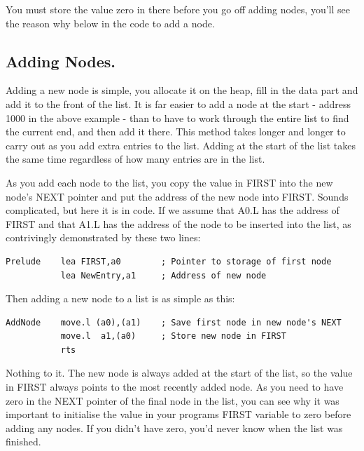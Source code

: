 You must store the value zero in there before you go off adding
    nodes, you'll see the reason why below in the code to add a node.

\subsection{Adding Nodes.}
\label{ch10-adding-nodes}%

Adding a new node is simple, you allocate it on the heap, fill in
      the data part and add it to the front of the list. It is far easier to
      add a node at the start -{} address 1000 in the above example -{} than to
      have to work through the entire list to find the current end, and then
      add it there. This method takes longer and longer to carry out as you
      add extra entries to the list. Adding at the start of the list takes the
      same time regardless of how many entries are in the list.

As you add each node to the list, you copy the value in FIRST into
      the new node's NEXT pointer and put the address of the new node into
      FIRST. Sounds complicated, but here it is in code. If we assume that
      A0.L has the address of FIRST and that A1.L has the address of the node
      to be inserted into the list, as contrivingly demonstrated by these two
      lines:

\begin{lstlisting}[firstnumber=1,caption={Adding a Node - Prelude},label={lst:AddingANodePrelude}]
Prelude    lea FIRST,a0        ; Pointer to storage of first node 
           lea NewEntry,a1     ; Address of new node
\end{lstlisting}

Then adding a new node to a list is as simple as this:

\begin{lstlisting}[firstnumber=last,caption={Adding a Node},label={lst:AddingANode}]
AddNode    move.l (a0),(a1)    ; Save first node in new node's NEXT
           move.l  a1,(a0)     ; Store new node in FIRST
           rts
\end{lstlisting}

Nothing to it. The new node is always added at the start of the
      list, so the value in FIRST always points to the most recently added
      node. As you need to have zero in the NEXT pointer of the final node in
      the list, you can see why it was important to initialise the value in
      your programs FIRST variable to zero before adding any nodes. If you
      didn't have zero, you'd never know when the list was finished.


